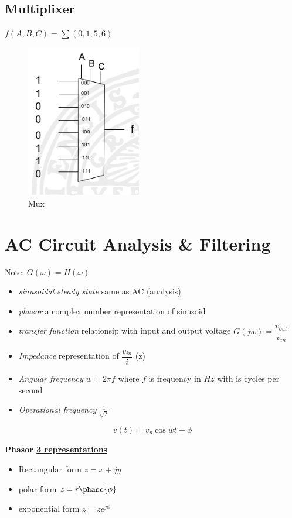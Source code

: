 \subsection{Multiplixer}
$f(A,B,C)=\sum(0,1,5,6)$
\begin{figure}[h]
    \centering
    \includegraphics[width=5cm]{image/mux.png}
    \caption{Mux}
\end{figure}


\newpage
\section{AC Circuit Analysis \& Filtering}
Note: $G(\omega)=H(\omega)$

\begin{itemize}
    \item \textit{sinusoidal steady state} same as AC (analysis)
    \item \textit{phasor} a complex number representation of sinusoid 
    \item \textit{transfer function} relationsip with input and output voltage $G(jw)=\dfrac{v_{out}}{v_{in}}$
    \item \textit{Impedance} representation of $\dfrac{v_{in}}{i}$ (z)
    \item \textit{Angular frequency} $w=2\pi f$ where $f$ is frequency in $Hz$ with is cycles per second
    \item \textit{Operational frequency} $\frac{1}{\sqrt{2}}$
\end{itemize}

\begin{equation}
    v(t)=v_p\cos{wt+\phi}
\end{equation}

\textbf{Phasor \underline{3 representations}}
\begin{itemize}
    \item Rectangular form $z=x+jy$
    \item polar form $z=r \phase{\phi}$
    \item exponential form $z=ze^{j\phi}$
\end{itemize}

